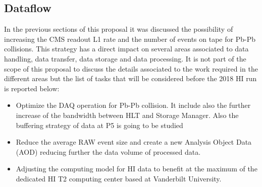 \subsection{Dataflow\label{subsec:dataflow}}
In the previous sections of this proposal it was discussed the possibility of increasing the CMS readout L1 rate and the number of events on tape for Pb-Pb collisions. This strategy has a direct impact on several areas associated to data handling, data transfer, data storage and data processing. It is not part of the scope of this proposal to discuss the details associated to the work required in the different areas but the list of tasks that will be considered before the 2018 HI run is reported below:

\begin{itemize}
\item Optimize the DAQ operation for Pb-Pb collision. It include also the further increase of the bandwidth between HLT and Storage Manager. Also the buffering strategy of data at P5 is going to be studied

\item Reduce the average RAW event size and create a new Analysis Object Data (AOD) reducing further the data volume of processed data.

\item Adjusting the computing model for HI data to benefit at the maximum of the dedicated HI T2 computing center based at Vanderbilt University. 
\end{itemize}

